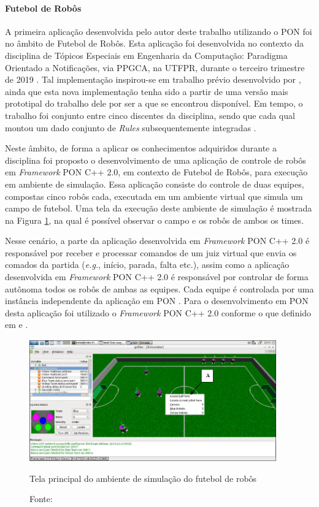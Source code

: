 \paragraph{Futebol de Robôs}

A primeira aplicação desenvolvida pelo autor deste trabalho utilizando o PON foi
no âmbito de Futebol de Robôs. Esta aplicação foi desenvolvida no contexto da
disciplina de Tópicos Especiais em Engenharia da Computação: Paradigma Orientado
a Notificações, via PPGCA, na UTFPR, durante o terceiro trimestre de 2019
\cite{lima_2020}. Tal implementação inspirou-se em trabalho prévio desenvolvido
por , ainda que esta nova implementação tenha sido a
partir de uma versão mais prototipal do trabalho dele por ser a que se encontrou
disponível. Em tempo, o trabalho foi conjunto entre cinco discentes da
disciplina, sendo que cada qual montou um dado conjunto de \textit{Rules}
subsequentemente integradas \cite{lima_2020}.

Neste âmbito, de forma a aplicar os conhecimentos adquiridos durante a
disciplina foi proposto o desenvolvimento de uma aplicação de controle de robôs
em \textit{Framework} PON C++ 2.0, em contexto de Futebol de Robôs, para
execução em ambiente de simulação. Essa aplicação consiste do controle de duas
equipes, compostas cinco robôs cada, executada em um ambiente virtual que simula
um campo de futebol. Uma tela da execução deste ambiente de simulação é mostrada
na Figura \ref{fig:futebol_robos}, na qual é possível observar o campo e os
robôs de ambos os times.

Nesse cenário, a parte da aplicação desenvolvida em \textit{Framework} PON C++
2.0 é responsável por receber e processar comandos de um juiz virtual que envia
os comados da partida (\textit{e.g.}, início, parada, falta etc.), assim como a
aplicação desenvolvida em \textit{Framework} PON C++ 2.0 é responsável por
controlar de forma autônoma todos os robôs de ambas as equipes. Cada equipe é
controlada por uma instância independente da aplicação em PON \cite{lima_2020}.
Para o desenvolvimento em PON desta aplicação foi utilizado o \textit{Framework}
PON C++ 2.0 conforme o que definido em  e
. 

\begin{figure}[!htb]
  \centering
  \includegraphics[width=0.95\textwidth]{../figures/futebol_robos.png}
  \smallskip
  \caption{Tela principal do ambiente de simulação do futebol de robôs}
  \caption*{Fonte: }
  \label{fig:futebol_robos}
\end{figure}

